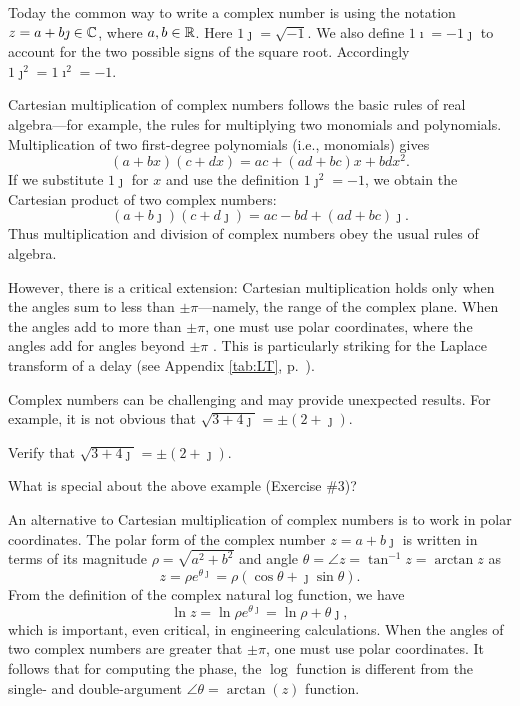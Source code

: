 \documentclass{ximera}
\begin{document}
Today the common way to write a complex number is using the notation $z=a+b\jmath \in \mathbb{C}$, where
${a,b} \in \mathbb{R}$.  Here $1\jmath=\sqrt{-1}$.  We also define $1\imath=-1\jmath$ to account for the
two possible signs of the square root.  Accordingly $1\jmath^2 = 1\imath^2 = -1$.

Cartesian multiplication of complex numbers follows the basic rules of real algebra---for example, the rules
for multiplying two monomials and polynomials.  Multiplication of two first-degree polynomials (i.e.,
monomials) gives 
 \[
(a+bx)(c+dx) = ac + (ad+bc)x + bdx^2.
\]
If we substitute $1\jmath$ for $x$ and use the definition $1\jmath^2=-1$, we obtain the Cartesian product
of two complex numbers:
 \[
(a+b\jmath)(c+d\jmath) = ac-bd + (ad+bc)\jmath.
\]
Thus multiplication and division of complex numbers obey the usual rules of algebra. 

However, there is a critical extension:
Cartesian multiplication holds only when the angles sum to less than $\pm\pi$---namely, the range of the complex plane. 
When the angles add to more than $\pm \pi$, one must use polar coordinates,
where the angles add for angles beyond $\pm \pi$ \citep[p.~8]{Boas87}. 
This is particularly striking for the Laplace transform of a delay (see Appendix \ref{tab:LT}, p.~\pageref{tab:LT}).

Complex numbers can be challenging and may provide unexpected results.  For example, it is not obvious that
$\sqrt{3+4\jmath}= \pm (2+\jmath)$.

\BEx%
Verify that $\sqrt{3+4\jmath}= \pm (2+\jmath)$.

\EEx

\BEx%
What is special about the above example (Exercise \#3)?

\EEx

An alternative to Cartesian multiplication of complex numbers is to work in polar coordinates. The polar
form of the complex number $z=a+b\jmath$ is written in terms of its magnitude $\rho = \sqrt{a^2+b^2}$ and angle
$\theta = \angle z = \tan^{-1}{z} = \arctan{z}$ as
\[
z = \rho e^{\theta\jmath} = \rho (\cos \theta  + \jmath \sin \theta ).
\]
From the definition of the complex natural log function, we have
 \[
 \ln z = \ln \rho e^{\theta\jmath} = \ln \rho + \theta\jmath,
 \]
which is important, even critical, in engineering calculations.
When the angles of two complex numbers are greater that $\pm \pi$, one must use polar coordinates.
It follows that for computing the phase, the $\log$ function is different from the single- and double-argument
$\angle \theta = \arctan(z)$ function. %
\end{document}
